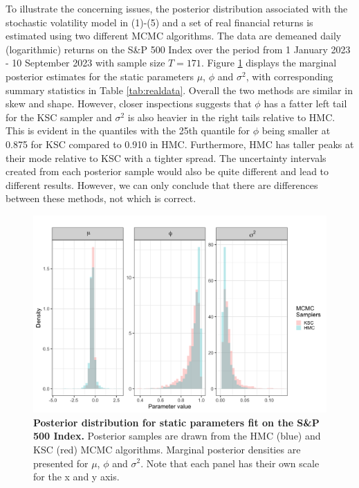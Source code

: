 \documentclass[12pt, a4paper]{article}
\begin{document}
    To illustrate the concerning issues, the posterior distribution associated with the stochastic volatility model in (1)-(5) and a set of real financial returns is estimated using two different MCMC algorithms. The data are demeaned daily (logarithmic) returns on the S\&P 500 Index over the period from 1 January 2023 - 10 September 2023 with sample size $T=171$. Figure \ref{fig:realdataex} displays the marginal posterior estimates for the static parameters $\mu$, $\phi$ and $\sigma^2$, with corresponding summary statistics in Table \ref{tab:realdata}. Overall the two methods are similar in skew and shape. However, closer inspections suggests that $\phi$ has a fatter left tail for the KSC sampler and $\sigma^2$ is also heavier in the right tails relative to HMC. This is evident in the quantiles with the 25th quantile for $\phi$ being smaller at 0.875 for KSC compared to 0.910 in HMC. Furthermore, HMC has taller peaks at their mode relative to KSC with a tighter spread. The uncertainty intervals created from each posterior sample would also be quite different and lead to different results. However, we can only conclude that there are differences between these methods, not which is correct.
        \begin{figure}[H]
        \centering
        \includegraphics[scale=0.1]{motivating_example/real_data_ex.png}
        \caption{\textbf{Posterior distribution for static parameters fit on the S\&P 500 Index.} Posterior samples are drawn from the HMC (blue) and KSC (red) MCMC algorithms. Marginal posterior densities are presented for $\mu$, $\phi$ and $\sigma^2$. Note that each panel has their own scale for the x and y axis.}
        \label{fig:realdataex}
    \end{figure}
\end{document}
